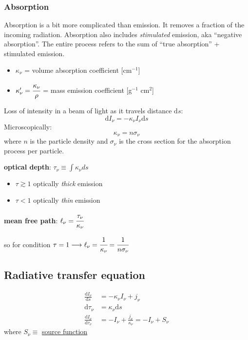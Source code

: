 \documentclass[12pt]{article}
\newcommand{\mar}[1]{\hspace{0pt}\marginpar{-\textcolor{black}{#1}-}}
\begin{document}
\subsubsection{Absorption}
Absorption is a bit more complicated than emission. It removes a fraction
of the incoming radiation. Absorption also includes \textit{stimulated}
emission, aka ``negative absorption''. The entire process refers to the sum
of ``true absorption'' + stimulated emission.
\begin{itemize}[label={}, itemsep=0ex]
    \item \mar{26}$\kappa_{\nu}$ =  volume absorption coefficient [cm$^{-1}$]
    \item $\kappa'_{\nu} = \cfrac{\kappa_{\nu}}{\rho}$
        = mass emission coefficient [g$^{-1}$ cm$^{2}$]
\end{itemize}
Loss of intensity in a beam of light as it travels distance $\mathrm{d}s$:
\[
    \mathrm{d}I_{\nu} = -\kappa_{\nu}I_{\nu}\mathrm{d}s
    \]
Microscopically:
\[
    \kappa_{\nu} = n\sigma_{\nu}
    \]
where $n$ is the particle density and $\sigma_{\nu}$ is the cross section
for the absorption process per particle.

\textbf{optical depth}: $ \tau_{\nu} \equiv \int{\kappa_{\nu}ds} $
\begin{itemize}
    \item $\tau \gtrsim 1$ optically \emph{thick} emission
    \item $\tau < 1$ optically \emph{thin} emission
\end{itemize}

\textbf{mean free path}: $ \ell_{\nu} = \cfrac{\tau_{\nu}}{\kappa_{\nu}} $

so for condition $\tau=1 \longrightarrow \ell_{\nu} = \cfrac{1}{\kappa_{\nu}} =
\cfrac{1}{n\sigma_{\nu}}$

\newpage
\subsection{Radiative transfer equation}
\begin{align*}
    \frac{\mathrm{d}I_{\nu}}{\mathrm{d}s} &= -\kappa_{\nu}I_{\nu} + j_{\nu}\\
    \mathrm{d}\tau_{\nu} &= \kappa_{\nu}\mathrm{d}s\\
    \frac{\mathrm{d}I_{\nu}}{\mathrm{d}\tau_{\nu}} &=
    -I_{\nu} + \frac{j_{\nu}}{\kappa_{\nu}} = -I_{\nu} + S_{\nu}
\end{align*}
where $S_{\nu} \equiv$ \underline{source function}
\end{document}
